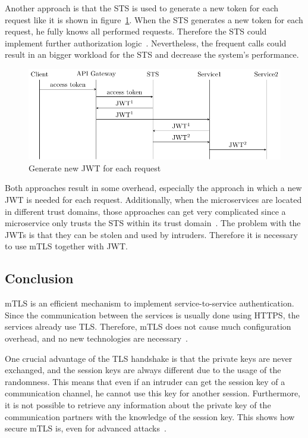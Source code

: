 Another approach is that the STS is used to generate a new token for each request like it is shown in figure~\ref{fig:mtls_id_2}.
When the STS generates a new token for each request, he fully knows all performed requests.
Therefore the STS could implement further authorization logic~\cite{dias2020microservices}.
Nevertheless, the frequent calls could result in an bigger workload for the STS and decrease the system's performance.

\begin{figure}[H]
	\centering
	\includegraphics{images/authentication-mechanisms/TikZ_jwt_identity_2.pdf}
	\caption{Generate new JWT for each request~\cite{dias2020microservices}}
	\label{fig:mtls_id_2}
\end{figure}

Both approaches result in some overhead, especially the approach in which a new JWT is needed for each request.
Additionally, when the microservices are located in different trust domains, those approaches can get very complicated since a microservice only trusts the STS within its trust domain~\cite{dias2020microservices}.
The problem with the JWTs is that they can be stolen and used by intruders.
Therefore it is necessary to use mTLS together with JWT.

\subsection{Conclusion}
mTLS is an efficient mechanism to implement service-to-service authentication.
Since the communication between the services is usually done using HTTPS, the services already use TLS.
Therefore, mTLS does not cause much configuration overhead, and no new technologies are necessary~\cite{dias2020microservices}.

One crucial advantage of the TLS handshake is that the private keys are never exchanged, and the session keys are always different due to the usage of the randomness.
This means that even if an intruder can get the session key of a communication channel, he cannot use this key for another session.
Furthermore, it is not possible to retrieve any information about the private key of the communication partners with the knowledge of the session key.
This shows how secure mTLS is, even for advanced attacks~\cite{parsovs2013practical}.

